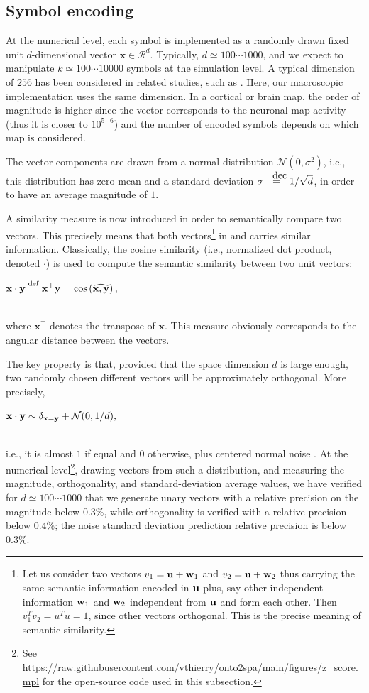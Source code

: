 \documentclass[sn-mathphys]{sn-jnl}
\newcommand{\defq}{\stackrel {\rm def}{=}}
\newcommand{\eqline}[1]{~\vspace{0.1cm}\\\centerline{$#1$}\vspace{0.1cm}\\}
\begin{document}
\subsection{Symbol encoding} \label{symbol-encoding}

At the numerical level, each symbol is implemented as a randomly drawn fixed unit $d$-dimensional vector $\mathbf{x} \in {\mathcal R}^d$. Typically, $d\simeq 100 \cdots 1000$, and we expect to manipulate $k\simeq 100 \cdots 10000$ symbols at the simulation level. A typical dimension of $256$ has been considered in related studies, such as \cite{mercier_ontology_2021}. Here, our macroscopic implementation uses the same dimension. In a cortical or brain map, the order of magnitude is higher since the vector corresponds to the neuronal map activity (thus it is closer to $10^{5\cdots 6}$) and the number of encoded symbols depends on which map is considered.

The vector components are drawn from a normal distribution ${\mathcal N}(0, \sigma^2)$, i.e., this distribution has zero mean and a standard deviation $\sigma \deq 1/\sqrt{d}$, in order to have an average magnitude of $1$.

A similarity measure is now introduced in order to semantically compare two vectors. This precisely means that both vectors\footnote{Let us consider two vectors ${v}_1 = {\bf u} + {\bf w}_1$ and ${v}_2 = {\bf u} + {\bf w}_2$ thus carrying the same semantic information encoded in ${\bf u}$ plus, say other independent information ${\bf w}_1$ and ${\bf w}_2$ independent from ${\bf u}$ and form each other. Then ${v}_1^T {v}_2 = {u}^T {u} = 1$, since other vectors orthogonal. This is the precise meaning of semantic similarity.} in and carries similar information. Classically, the cosine similarity (i.e., normalized dot product, denoted $\cdot$) is used to compute the semantic similarity between two unit vectors:
\eqline{\mathbf{x} \cdot \mathbf{y} \defq \mathbf{x}^\top \mathbf{y} = \cos\left(\widehat{\mathbf{x}, \mathbf{y}}\right),}
where $\mathbf{x}^\top$ denotes the transpose of $\mathbf{x}$.  This measure obviously corresponds to the angular distance between the vectors.

The key property is that, provided that the space dimension $d$ is large enough, two randomly chosen different vectors will be approximately orthogonal. More precisely,
\eqline{{\bf x} \cdot {\bf y} \sim \delta_{{\bf x} = {\bf y}} + {\mathcal N}(0, 1/d),}
i.e., it is almost $1$ if equal and $0$ otherwise, plus  centered normal noise \cite{schlegel_comparison_2020}. At the numerical level\footnote{See \url{https://raw.githubusercontent.com/vthierry/onto2spa/main/figures/z_score.mpl} for the open-source code used in this subsection.}, drawing vectors from such a distribution, and measuring the magnitude, orthogonality, and standard-deviation average values, we have verified for $d\simeq 100 \cdots 1000$ that we generate unary vectors with a relative precision on the magnitude below $0.3\%$, while orthogonality is verified with a relative precision below $0.4\%$; the noise standard deviation prediction relative precision is below $0.3\%$. 
\end{document}
